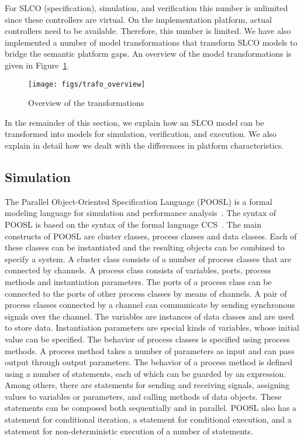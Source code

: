 For SLCO (specification), simulation, and verification this number is unlimited since these controllers are virtual.
On the implementation platform, actual controllers need to be available.
Therefore, this number is limited.
We have also implemented a number of model transformations that transform SLCO models to bridge the semantic platform gaps.
An overview of the model transformations is given in Figure~\ref{fig:trafo_overview}.
\begin{figure}[hbt]
 \centering
 \texttt{[image: figs/trafo\_overview]}
 \caption{Overview of the transformations}
 \label{fig:trafo_overview}
\end{figure}
In the remainder of this section, we explain how an SLCO model can be transformed into models for simulation, verification, and execution.
We also explain in detail how we dealt with the differences in platform characteristics.

\subsection{Simulation}
The Parallel Object-Oriented Specification Language (POOSL) is a formal modeling language for simulation and performance analysis~\cite{Theelen2007}.
The syntax of POOSL is based on the syntax of the formal language CCS~\cite{Milner1989}.
The main constructs of POOSL are cluster classes, process classes and data classes.
Each of these classes can be instantiated and the resulting objects can be combined to specify a system.
A cluster class consists of a number of process classes that are connected by channels.
A process class consists of variables, ports, process methods and instantiation parameters.
The ports of a process class can be connected to the ports of other process classes by means of channels.
A pair of process classes connected by a channel can communicate by sending synchronous signals over the channel.
The variables are instances of data classes and are used to store data.
Instantiation parameters are special kinds of variables, whose initial value can be specified.
The behavior of process classes is specified using process methods.
A process method takes a number of parameters as input and can pass output through output parameters.
The behavior of a process method is defined using a number of statements, each of which can be guarded by an expression.
Among others, there are statements for sending and receiving signals, assigning values to variables or parameters, and calling methods of data objects.
These statements can be composed both sequentially and in parallel.
POOSL also has a statement for conditional iteration, a statement for conditional execution, and a statement for non-deterministic execution of a number of statements.

